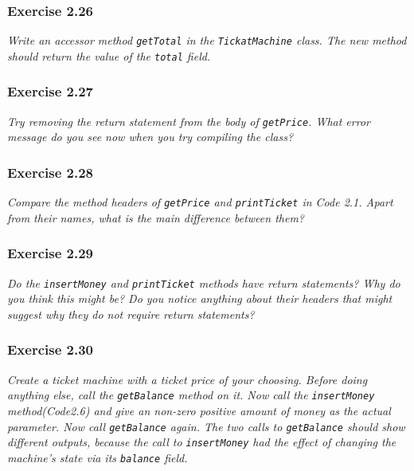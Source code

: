 \subsubsection{Exercise 2.26}
\textit{Write an accessor method \verb?getTotal? in the \verb?TickatMachine? 
class. The new method should return the value of the \verb?total? field. }

\subsubsection{Exercise 2.27}
\textit{Try removing the return statement from the body of \verb?getPrice?. 
What error message do you see now when you try compiling the class? }

\subsubsection{Exercise 2.28}
\textit{Compare the method headers of \verb?getPrice? and \verb?printTicket? in 
Code 2.1. Apart from their names, what is the main difference between them? }

\subsubsection{Exercise 2.29}
\textit{Do the \verb?insertMoney? and \verb?printTicket? methods have return 
statements? Why do you think this might be? Do you notice anything about their 
headers that might suggest why they do not require return statements? }

\subsubsection{Exercise 2.30}
\textit{Create a ticket machine with a ticket price of your choosing. Before 
doing anything else, call the \verb?getBalance? method on it. Now call the 
\verb?insertMoney? method(Code2.6) and give an non-zero positive amount of 
money as the actual parameter. Now call \verb?getBalance? again. The two calls 
to \verb?getBalance? should show different outputs, because the call to 
\verb?insertMoney? had the effect of changing the machine's state via its 
\verb?balance? field. }

